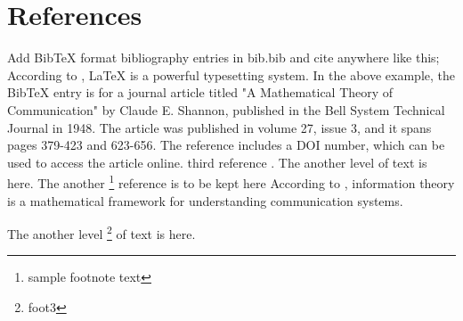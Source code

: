 \section{References}
Add BibTeX format bibliography entries in bib.bib and cite anywhere like this; \cite{sample_cite}
According to \cite{knuth1984texbook}, LaTeX is a powerful typesetting system.
In the above example, the BibTeX entry is for a journal article titled "A Mathematical Theory of Communication" by Claude E. Shannon, published in the Bell System Technical Journal in 1948. The article was published in volume 27, issue 3, and it spans pages 379-423 and 623-656. The reference includes a DOI number, which can be used to access\cite{sample_cite} the article online.  third reference \cite{Shannon1948}. The another level of text is here. The another \footnote{sample footnote text} reference is to be kept here
According to \cite{Shannon19482}, information theory is a mathematical framework for understanding communication systems.

The another level \footnote{foot3} of text is here.



